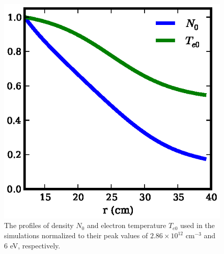 \documentclass[showpacs,preprintnumbers,amsmath,amssymb,superscriptaddress,aip]{revtex4-1}
\begin{document}
\begin{figure}[!htbp]
\includegraphics[]{equilibrium_profiles}
\hfil
\caption{The profiles of density $N_0$ and electron temperature $T_{e0}$ used in the simulations normalized to their peak values of $2.86 \times 10^{12}$ cm$^{-3}$ and 
$6$ eV, respectively.}
\label{eq_profiles}
\end{figure}
\end{document}
